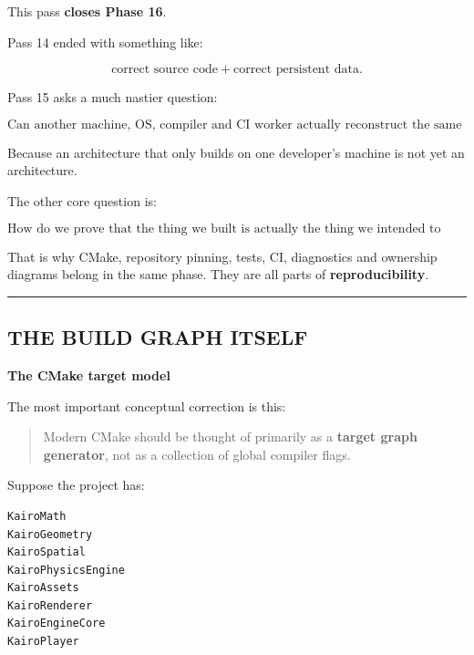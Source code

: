 \hypertarget{03-visual-computing-i-ch017-cmake-target-semantics-usage-requirements-presets-ninja-dags-toolchains-clangmsvc-portability-c-modules-repository-pinning-reproducible-superbuilds-ci-matrices-test-architecture-crashloggingprofiling-hooks-portable-engine-boundaries-and-the-complete-sourceeditorpackageruntime-ownership-graph}{}

This pass \textbf{closes Phase 16}.

Pass 14 ended with something like:

\[
\text{correct source code}
+
\text{correct persistent data}.
\]

Pass 15 asks a much nastier question:

\[
\boxed{
\text{Can another machine, OS, compiler and CI worker actually reconstruct the same engine correctly?}
}
\]

Because an architecture that only builds on one developer's machine is not yet an architecture.

The other core question is:

\[
\boxed{
\text{How do we prove that the thing we built is actually the thing we intended to build?}
}
\]

That is why CMake, repository pinning, tests, CI, diagnostics and ownership diagrams belong in the same phase. They are all parts of \textbf{reproducibility}.

\begin{center}\rule{0.5\linewidth}{0.5pt}\end{center}

\subsection{THE BUILD GRAPH ITSELF}\label{03-visual-computing-i-ch017-the-build-graph-itself}

\hypertarget{03-visual-computing-i-ch017-the-build-graph-itself}{}

\textbf{The CMake target model}

The most important conceptual correction is this:

\begin{quote}
Modern CMake should be thought of primarily as a \textbf{target graph generator}, not as a collection of global compiler flags.
\end{quote}

Suppose the project has:

\begin{verbatim}
KairoMath
KairoGeometry
KairoSpatial
KairoPhysicsEngine
KairoAssets
KairoRenderer
KairoEngineCore
KairoPlayer
\end{verbatim}

